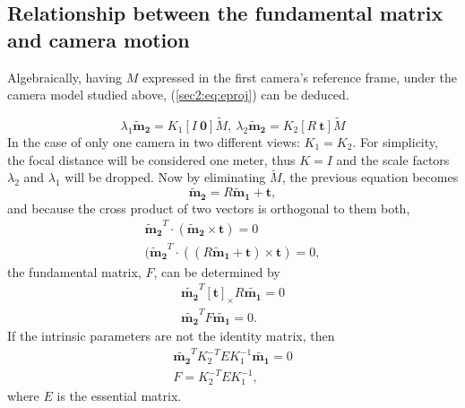 \subsection{Relationship between the fundamental matrix and camera motion}
Algebraically, having $M$ expressed in the first camera's reference frame, under the camera model studied above, (\ref{sec2:eq:eproj}) can be deduced.

\begin{equation}
\label{sec2:eq:eproj}
\lambda_1 \mathbf{\tilde{m}_2} = K _1 [ I \ \mathbf{0} ] \tilde{M}, \
\lambda_2 \mathbf{\tilde{m}_2} = K_2 [ R \ \mathbf{t} ] \tilde{M}
\end{equation}
In the case of only one camera in two different views: $K_1 = K_2$. For simplicity, the focal distance will be considered one meter, thus $K= I$ and the scale factors $\lambda_2$ and $\lambda_1$ will be dropped.
Now by eliminating $\tilde{M}$, the previous equation becomes
\begin{equation}
\label{sec2:eq:elimp}
\mathbf{\tilde{m}_2} = R   \mathbf{\tilde{m}_1} + \mathbf{t},
\end{equation}
and because the cross product of two vectors is orthogonal to them both,  
\begin{align}
	\label{sec2:eq:fundm1}
	\mathbf{\tilde{m}_2}^T \cdot ( \mathbf{\tilde{m}_2} \times \mathbf{t}) = 0 \\
	\label{sec2:eq:fundm2}
	( \mathbf{\tilde{m}_2}^T\cdot((R  \mathbf{\tilde{m}_1} + \mathbf{t}) \times \mathbf{t}) = 0,
\end{align}
the fundamental matrix, $F$, can be determined by 
\begin{equation}
\label{sec2:eq:fundm3}
\begin{aligned}
\mathbf{\tilde{m_2}}^T [\mathbf{t}]_\times R \mathbf{\tilde{m_1}} = 0 \\
\mathbf{\tilde{m_2}}^T F \mathbf{\tilde{m_1}} = 0.
\end{aligned}
\end{equation}
If the intrinsic parameters are not the identity matrix, then 
\begin{equation}
\begin{aligned}
\label{hhh}
\mathbf{\tilde{m_2}}^T K_2^{-T} E K_1^{-1} \mathbf{\tilde{m_1}} = 0 \\
F = K_2^{-T}  E K_1^{-1},
\end{aligned}
\end{equation}
where $E$ is the essential matrix.

